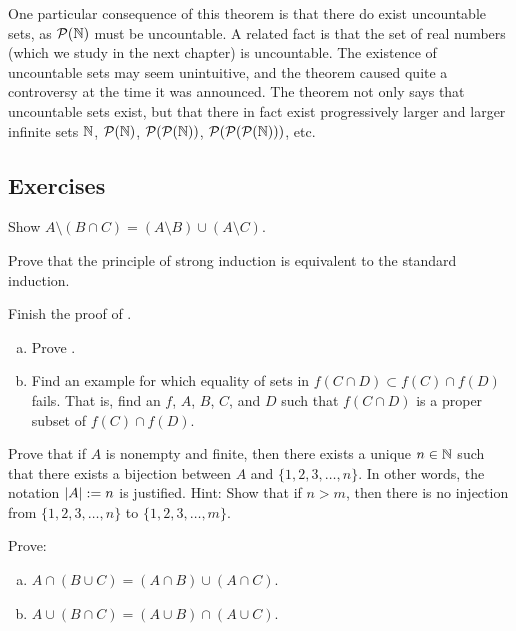One particular consequence of this 
theorem is that there do exist uncountable sets,
as ${\mathcal{P}}({\mathbb{N}})$ must be uncountable.
A related fact is that
the set of real numbers (which we study in the next chapter) is uncountable.
The existence of uncountable sets may seem unintuitive, and the theorem
caused quite a controversy at the time
it was announced.  The theorem not only says that uncountable sets exist,
but that there in fact exist progressively larger
and larger infinite sets ${\mathbb{N}}$, ${\mathcal{P}}({\mathbb{N}})$,
${\mathcal{P}}({\mathcal{P}}({\mathbb{N}}))$, ${\mathcal{P}}({\mathcal{P}}({\mathcal{P}}({\mathbb{N}})))$, etc.

\subsection{Exercises}

\begin{exercise}
Show
$A \setminus (B \cap C) = (A \setminus B) \cup (A \setminus C)$.
\end{exercise}

\begin{exercise}
Prove that the principle of strong induction is equivalent to the standard
induction.
\end{exercise}

\begin{exercise}
Finish the proof of .
\end{exercise}

\begin{exercise}
\leavevmode
\begin{enumerate}[a)]
\item
Prove .
\item
Find an example for which equality of sets
in 
$f( C \cap D) \subset f (C) \cap f (D)$
fails.  That is, find an $f$, $A$, $B$, $C$, and $D$ such that
$f( C \cap D)$ is a proper subset of $f(C) \cap f(D)$.
\end{enumerate}
\end{exercise}

\begin{exercise}[Tricky]
Prove that if $A$ is nonempty and finite, then there exists a unique
$n \in {\mathbb{N}}$ such
that there exists a bijection between $A$ and $\{ 1, 2, 3, \ldots, n \}$.
In other words, the notation $\left\lvert {A} \right\rvert := n$ is justified.
Hint: Show that if $n > m$, then there is no injection from
$\{ 1, 2, 3, \ldots, n \}$ to
$\{ 1, 2, 3, \ldots, m \}$.
\end{exercise}


\begin{exercise}
Prove:
\begin{enumerate}[a)]
\item $A \cap (B \cup C) = (A \cap B) \cup (A \cap C)$.
\item $A \cup (B \cap C) = (A \cup B) \cap (A \cup C)$.
\end{enumerate}
\end{exercise}

